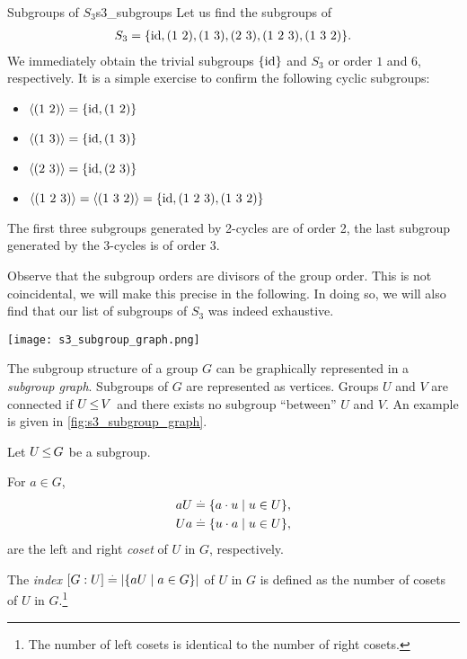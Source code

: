 \begin{ex}{Subgroups of $S_3$}{s3_subgroups}
Let us find the subgroups of \begin{align*}
    S_3 = \{\mathrm{id}, (1\ 2), (1\ 3), (2\ 3), (1\ 2\ 3), (1\ 3\ 2)\}.
\end{align*} We immediately obtain the trivial subgroups $\{\mathrm{id}\}$ and $S_3$ or order $1$ and $6$, respectively. It is a simple exercise to confirm the following cyclic subgroups: \begin{itemize}
    \item $\gen{(1\ 2)} = \{\id, (1\ 2)\}$
    \item $\gen{(1\ 3)} = \{\id, (1\ 3)\}$
    \item $\gen{(2\ 3)} = \{\id, (2\ 3)\}$
    \item $\langle (1\ 2\ 3) \rangle = \langle (1\ 3\ 2) \rangle = \{\mathrm{id}, (1\ 2\ 3), (1\ 3\ 2)\}$
\end{itemize} The first three subgroups generated by 2-cycles are of order 2, the last subgroup generated by the 3-cycles is of order 3.

Observe that the subgroup orders are divisors of the group order. This is not coincidental, we will make this precise in the following. In doing so, we will also find that our list of subgroups of $S_3$ was indeed exhaustive.
\end{ex}

\begin{marginfigure}
    \texttt{[image: s3\_subgroup\_graph.png]}
    \caption{Subgroup graph of the symmetric group $S_3$. The order of the subgroups is shown in orange.}\label{fig:s3_subgroup_graph}
\end{marginfigure}
    
The subgroup structure of a group $G$ can be graphically represented in a \emph{subgroup graph}. Subgroups of $G$ are represented as vertices. Groups $U$ and $V$ are connected if $U \operatorname*{\leq} V$ and there exists no subgroup ``between'' $U$ and $V$. An example is given in \cref{fig:s3_subgroup_graph}.

\begin{defn}
Let $U \operatorname*{\leq} G$ be a subgroup.
\begin{defnlist}
    \item For $a \in G$, \begin{align}
        aU &\overset{.}{=} \{a \cdot u \mid u \in U\}, \label{eq:left_coset} \\
        Ua &\overset{.}{=} \{u \cdot a \mid u \in U\},
    \end{align} are the left and right \emph{coset} of $U$ in $G$, respectively.
    \item\label{defn:index} The \emph{index} $[G : U] \overset{.}{=} |\{aU \mid a \in G\}|$ of $U$ in $G$ is defined as the number of cosets of $U$ in $G$.\footnote{The number of left cosets is identical to the number of right cosets.}
\end{defnlist}
\end{defn}

